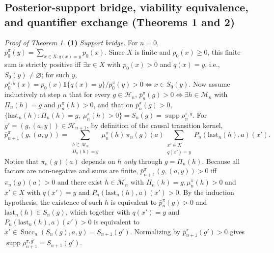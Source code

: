 \documentclass[11pt,a4paper]{article}
\begin{document}
\subsection{Posterior-support bridge, viability equivalence, and
quantifier exchange (Theorems 1 and
2)}\label{posterior-support-bridge-viability-equivalence-and-quantifier-exchange-theorems-1-and-2}

\emph{Proof of Theorem 1.} \textbf{(1)} \emph{Support bridge.} For
\(n = 0\), \(\bar{p}_0^\pi(y) = \sum_{x \in X : q(x)=y} p_0(x)\). Since
\(X\) is finite and \(p_0(x) \ge 0\), this finite sum is strictly
positive iff \(\exists x \in X\) with \(p_0(x) > 0\) and \(q(x) = y\),
i.e., \(S_0(y) \neq \varnothing\); for such \(y\),
\(\rho_0^{\pi, y}(x) = p_0(x)\mathbf{1}\{q(x)=y\}/\bar{p}_0^\pi(y) > 0 \iff x \in S_0(y)\).
Now assume inductively at step \(n\) that for every
\(g \in \mathcal{H}_n\),
\(\bar{p}_n^\pi(g) > 0 \iff \exists h \in \mathcal{M}_n\) with
\(\Pi_n(h) = g\) and \(\mu_n^\pi(h) > 0\), and that on
\(\bar{p}_n^\pi(g) > 0\),
\(\{ \mathrm{last}_n(h) : \Pi_n(h)=g,\ \mu_n^\pi(h)>0 \} = S_n(g) = \operatorname{supp}\rho_n^{\pi,g}\).
For \(g' = (g, (a, y)) \in \mathcal{H}_{n+1}\), by definition of the
causal transition kernel,
\[\bar{p}_{n+1}^\pi(g, (a, y)) = \sum_{\substack{h \in \mathcal{M}_n \\ \Pi_n(h) = g}} \mu_n^\pi(h)\, \pi_n(g)(a) \sum_{\substack{x' \in X \\ q(x') = y}} P_n(\mathrm{last}_n(h), a)(x').\]
Notice that \(\pi_n(g)(a)\) depends on \(h\) \emph{only} through
\(g = \Pi_n(h)\). Because all factors are non-negative and sums are
finite, \(\bar{p}_{n+1}^\pi(g, (a, y)) > 0\) iff \(\pi_n(g)(a) > 0\) and
there exist \(h \in \mathcal{M}_n\) with
\(\Pi_n(h) = g, \mu_n^\pi(h) > 0\) and \(x' \in X\) with \(q(x') = y\)
and \(P_n(\mathrm{last}_n(h), a)(x') > 0\). By the induction hypothesis,
the existence of such \(h\) is equivalent to \(\bar{p}_n^\pi(g) > 0\)
and \(\mathrm{last}_n(h) \in S_n(g)\), which together with \(q(x') = y\)
and \(P_n(\mathrm{last}_n(h),a)(x') > 0\) is equivalent to
\(x' \in \operatorname{Succ}_n(S_n(g), a, y) = S_{n+1}(g')\).
Normalizing by \(\bar{p}_{n+1}^\pi(g') > 0\) gives
\(\operatorname{supp}\rho_{n+1}^{\pi, g'} = S_{n+1}(g')\).
\end{document}
